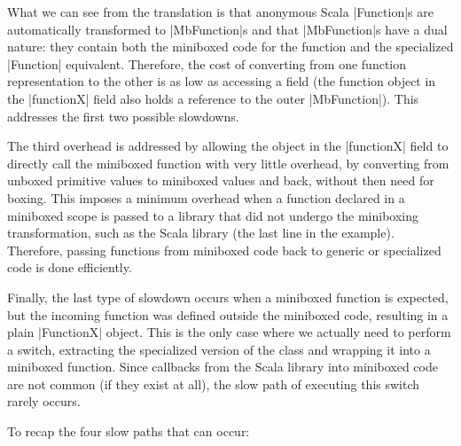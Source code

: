 What we can see from the translation is that anonymous Scala |Function|s are automatically transformed to |MbFunction|s and that |MbFunction|s have a dual nature: they contain both the miniboxed code for the function and the specialized |Function| equivalent. Therefore, the cost of converting from one function representation to the other is as low as accessing a field (the function object in the |functionX| field also holds a reference to the outer |MbFunction|). This addresses the first two possible slowdowns.

The third overhead is addressed by allowing the object in the |functionX| field to directly call the miniboxed function with very little overhead, by converting from unboxed primitive values to miniboxed values and back, without then need for boxing. This imposes a minimum overhead when a function declared in a miniboxed scope is passed to a library that did not undergo the miniboxing transformation, such as the Scala library (the last line in the example). Therefore, passing functions from miniboxed code back to generic or specialized code is done efficiently.

Finally, the last type of slowdown occurs when a miniboxed function is expected, but the incoming function was defined outside the miniboxed code, resulting in a plain |FunctionX| object. This is the only case where we actually need to perform a switch, extracting the specialized version of the class and wrapping it into a miniboxed function. Since callbacks from the Scala library into miniboxed code are not common (if they exist at all), the slow path of executing this switch rarely occurs.

To recap the four slow paths that can occur:


